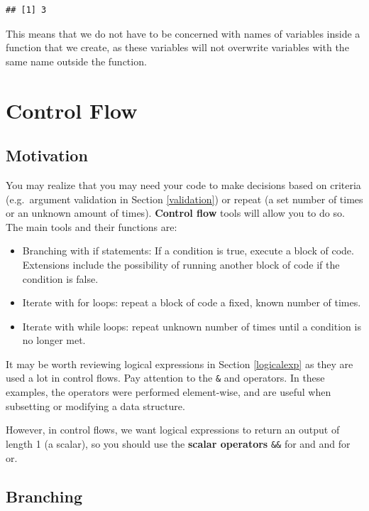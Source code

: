 \documentclass[
]{book}
\providecommand{\tightlist}{%
  \setlength{\itemsep}{0pt}\setlength{\parskip}{0pt}}
\theoremstyle{definition}
\theoremstyle{definition}
\theoremstyle{definition}
\theoremstyle{definition}
\theoremstyle{remark}
\begin{document}
\begin{verbatim}
## [1] 3
\end{verbatim}

This means that we do not have to be concerned with names of variables inside a function that we create, as these variables will not overwrite variables with the same name outside the function.

\hypertarget{control}{%
\chapter{Control Flow}\label{control}}

\hypertarget{motivation-2}{%
\section{Motivation}\label{motivation-2}}

You may realize that you may need your code to make decisions based on criteria (e.g.~argument validation in Section \ref{validation}) or repeat (a set number of times or an unknown amount of times). \textbf{Control flow} tools will allow you to do so. The main tools and their functions are:

\begin{itemize}
\tightlist
\item
  Branching with if statements: If a condition is true, execute a block of code. Extensions include the possibility of running another block of code if the condition is false.
\item
  Iterate with for loops: repeat a block of code a fixed, known number of times.
\item
  Iterate with while loops: repeat unknown number of times until a condition is no longer met.
\end{itemize}

It may be worth reviewing logical expressions in Section \ref{logicalexp} as they are used a lot in control flows. Pay attention to the \texttt{\&} and \texttt{\textbar{}} operators. In these examples, the operators were performed element-wise, and are useful when subsetting or modifying a data structure.

However, in control flows, we want logical expressions to return an output of length 1 (a scalar), so you should use the \textbf{scalar operators} \texttt{\&\&} for and and \texttt{\textbar{}\textbar{}} for or.

\hypertarget{branching}{%
\section{Branching}\label{branching}}
\end{document}
